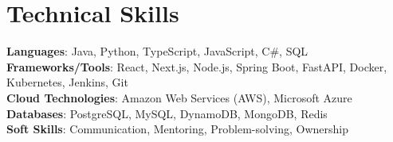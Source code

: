 \documentclass[letterpaper,11pt]{article}
\begin{document}
\section{Technical Skills}
    \begin{itemize}[leftmargin=0.15in, label={}]
    \small{\item{
        \textbf{Languages}{: Java, Python, TypeScript, JavaScript, C\#, SQL} \\
        \textbf{Frameworks/Tools}{: React, Next.js, Node.js, Spring Boot, FastAPI, Docker, Kubernetes, Jenkins, Git} \\
        \textbf{Cloud Technologies}{: Amazon Web Services (AWS), Microsoft Azure} \\
        \textbf{Databases}{: PostgreSQL, MySQL, DynamoDB, MongoDB, Redis} \\
        \textbf{Soft Skills}{: Communication, Mentoring, Problem-solving, Ownership}
    }}
    \end{itemize}
\end{document}

